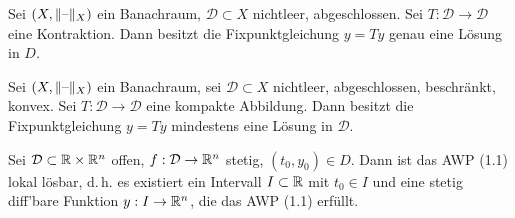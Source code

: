 \documentclass{cheat-sheet}
\begin{document}
\begin{satz}
  Sei $(X, \lVert\text{--}\rVert_X)$ ein Banachraum, $\mathcal{D} \subset X$ nichtleer, abgeschlossen. Sei $T : \mathcal{D} \to \mathcal{D}$ eine Kontraktion. Dann besitzt die Fixpunktgleichung $y = Ty$ genau eine Lösung in $D$.
\end{satz}

\begin{satz}
  Sei $(X, \lVert\text{--}\rVert_X)$ ein Banachraum, sei $\mathcal{D} \subset X$ nichtleer, abgeschlossen, beschränkt, konvex. Sei $T : \mathcal{D} \to \mathcal{D}$ eine kompakte Abbildung. Dann besitzt die Fixpunktgleichung $y = Ty$ mindestens eine Lösung in $\mathcal{D}$.
\end{satz}


\begin{satz}
  Sei $\mathcal{D} \subset \mathbb{R} \times \mathbb{R}^n$ offen, $f : \mathcal{D} \to \mathbb{R}^n$ stetig, $(t_0, y_0) \in D$. Dann ist das AWP (1.1) lokal lösbar, d.\,h. es existiert ein Intervall $I \subset \mathbb{R}$ mit $t_0 \in I$ und eine stetig diff'bare Funktion $y : I \to \mathbb{R}^n$, die das AWP (1.1) erfüllt.
\end{satz}
\end{document}
